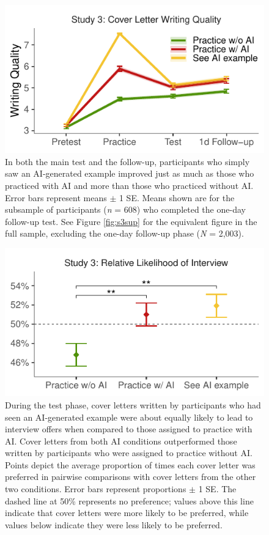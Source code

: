 \documentclass[11pt]{report}
\begin{document}
\begin{mainf}
\begin{figure}[t]
    \centering
    \includegraphics[width=\linewidth]{average_test_rewritten_lines_raw.pdf}
    \caption{
    In both the main test and the follow-up, participants who simply saw an AI-generated example improved just as much as those who practiced with AI and more than those who practiced without AI.
    Error bars represent means $\pm$ 1 SE.
    Means shown are for the subsample of participants  (\textit{n} = 608) who completed the one-day follow-up test.
    See Figure \ref{fig:s3sup} for the equivalent figure in the full sample, excluding the one-day follow-up phase (\textit{N} = 2,003).}
    \label{fig:s3}
\end{figure}

\begin{figure}[ht]
    \centering
    \includegraphics[width=1\linewidth]{ratings2.pdf}
    \caption{During the test phase, cover letters written by participants who had seen an AI-generated example were about equally likely to lead to interview offers when compared to those assigned to practice with AI. Cover letters from both AI conditions outperformed those written by participants who were assigned to practice without AI. Points depict the average proportion of times each cover letter was preferred in pairwise comparisons with cover letters from the other two conditions. Error bars represent proportions $\pm$ 1 SE. The dashed line at 50\% represents no preference; values above this line indicate that cover letters were more likely to be preferred, while values below indicate they were less likely to be preferred.}
    \label{fig:ratings2}
\end{figure}





\end{mainf}
\end{document}
